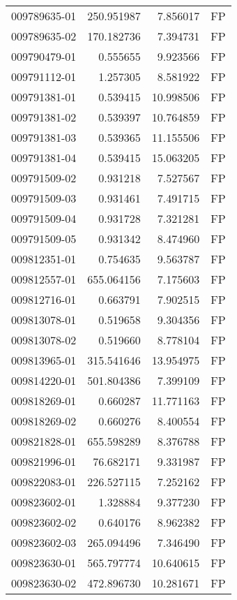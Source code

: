 \begin{tabular}{lrrl}
009789635-01 &  250.951987 &     7.856017 &   FP \\
009789635-02 &  170.182736 &     7.394731 &   FP \\
009790479-01 &    0.555655 &     9.923566 &   FP \\
009791112-01 &    1.257305 &     8.581922 &   FP \\
009791381-01 &    0.539415 &    10.998506 &   FP \\
009791381-02 &    0.539397 &    10.764859 &   FP \\
009791381-03 &    0.539365 &    11.155506 &   FP \\
009791381-04 &    0.539415 &    15.063205 &   FP \\
009791509-02 &    0.931218 &     7.527567 &   FP \\
009791509-03 &    0.931461 &     7.491715 &   FP \\
009791509-04 &    0.931728 &     7.321281 &   FP \\
009791509-05 &    0.931342 &     8.474960 &   FP \\
009812351-01 &    0.754635 &     9.563787 &   FP \\
009812557-01 &  655.064156 &     7.175603 &   FP \\
009812716-01 &    0.663791 &     7.902515 &   FP \\
009813078-01 &    0.519658 &     9.304356 &   FP \\
009813078-02 &    0.519660 &     8.778104 &   FP \\
009813965-01 &  315.541646 &    13.954975 &   FP \\
009814220-01 &  501.804386 &     7.399109 &   FP \\
009818269-01 &    0.660287 &    11.771163 &   FP \\
009818269-02 &    0.660276 &     8.400554 &   FP \\
009821828-01 &  655.598289 &     8.376788 &   FP \\
009821996-01 &   76.682171 &     9.331987 &   FP \\
009822083-01 &  226.527115 &     7.252162 &   FP \\
009823602-01 &    1.328884 &     9.377230 &   FP \\
009823602-02 &    0.640176 &     8.962382 &   FP \\
009823602-03 &  265.094496 &     7.346490 &   FP \\
009823630-01 &  565.797774 &    10.640615 &   FP \\
009823630-02 &  472.896730 &    10.281671 &   FP \\

\end{tabular}

